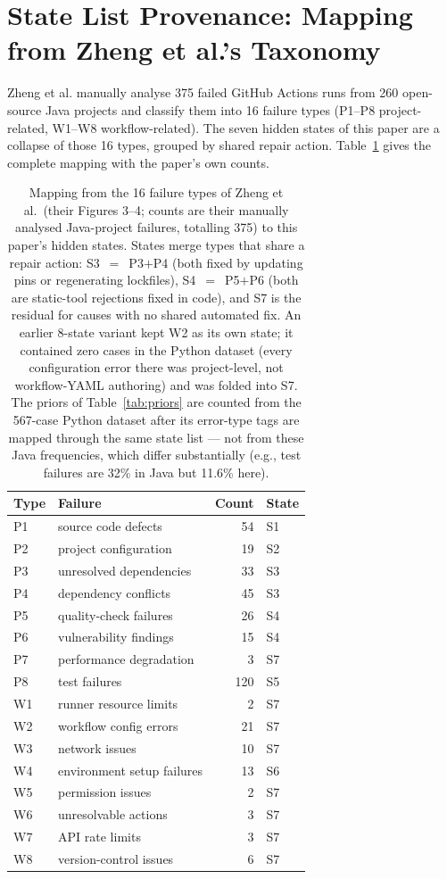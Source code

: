 \documentclass{article}
\begin{document}
\section{State List Provenance: Mapping from Zheng et al.'s Taxonomy}
\label{app:mapping}

Zheng et al. \cite{zheng2025gha} manually analyse 375 failed GitHub Actions runs from 260 open-source Java projects and classify them into 16 failure types (P1--P8 project-related, W1--W8 workflow-related). The seven hidden states of this paper are a collapse of those 16 types, grouped by shared repair action. Table~\ref{tab:mapping} gives the complete mapping with the paper's own counts.

\begin{table}[h]
\centering
\small
\setlength{\tabcolsep}{4pt}
\begin{tabular}{llrl}
\toprule
Type & Failure & Count & State \\
\midrule
P1 & source code defects & 54 & S1 \\
P2 & project configuration & 19 & S2 \\
P3 & unresolved dependencies & 33 & S3 \\
P4 & dependency conflicts & 45 & S3 \\
P5 & quality-check failures & 26 & S4 \\
P6 & vulnerability findings & 15 & S4 \\
P7 & performance degradation & 3 & S7 \\
P8 & test failures & 120 & S5 \\
W1 & runner resource limits & 2 & S7 \\
W2 & workflow config errors & 21 & S7 \\
W3 & network issues & 10 & S7 \\
W4 & environment setup failures & 13 & S6 \\
W5 & permission issues & 2 & S7 \\
W6 & unresolvable actions & 3 & S7 \\
W7 & API rate limits & 3 & S7 \\
W8 & version-control issues & 6 & S7 \\
\bottomrule
\end{tabular}
\caption{Mapping from the 16 failure types of Zheng et al.\ (their Figures 3--4; counts are their manually analysed Java-project failures, totalling 375) to this paper's hidden states. States merge types that share a repair action: S3~$=$~P3$+$P4 (both fixed by updating pins or regenerating lockfiles), S4~$=$~P5$+$P6 (both are static-tool rejections fixed in code), and S7 is the residual for causes with no shared automated fix. An earlier 8-state variant kept W2 as its own state; it contained zero cases in the Python dataset (every configuration error there was project-level, not workflow-YAML authoring) and was folded into S7. The priors of Table~\ref{tab:priors} are counted from the 567-case Python dataset after its error-type tags are mapped through the same state list --- not from these Java frequencies, which differ substantially (e.g., test failures are 32\% in Java but 11.6\% here).}
\label{tab:mapping}
\end{table}
\end{document}
